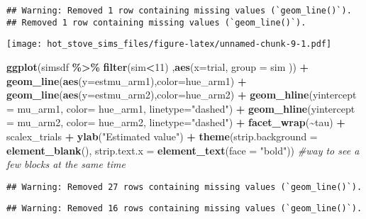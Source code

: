 \documentclass[
]{article}
\newenvironment{Shaded}{\begin{snugshade}}{\end{snugshade}}
\newcommand{\AttributeTok}[1]{\textcolor[rgb]{0.13,0.29,0.53}{#1}}
\newcommand{\CommentTok}[1]{\textcolor[rgb]{0.56,0.35,0.01}{\textit{#1}}}
\newcommand{\DecValTok}[1]{\textcolor[rgb]{0.00,0.00,0.81}{#1}}
\newcommand{\FunctionTok}[1]{\textcolor[rgb]{0.13,0.29,0.53}{\textbf{#1}}}
\newcommand{\NormalTok}[1]{#1}
\newcommand{\SpecialCharTok}[1]{\textcolor[rgb]{0.81,0.36,0.00}{\textbf{#1}}}
\newcommand{\StringTok}[1]{\textcolor[rgb]{0.31,0.60,0.02}{#1}}
\begin{document}
\begin{verbatim}
## Warning: Removed 1 row containing missing values (`geom_line()`).
## Removed 1 row containing missing values (`geom_line()`).
\end{verbatim}

\texttt{[image: hot\_stove\_sims\_files/figure-latex/unnamed-chunk-9-1.pdf]}

\begin{Shaded}
\begin{Highlighting}[]
\FunctionTok{ggplot}\NormalTok{(simsdf }\SpecialCharTok{\%\textgreater{}\%} \FunctionTok{filter}\NormalTok{(sim}\SpecialCharTok{\textless{}}\DecValTok{11}\NormalTok{) ,}\FunctionTok{aes}\NormalTok{(}\AttributeTok{x=}\NormalTok{trial, }\AttributeTok{group =}\NormalTok{ sim )) }\SpecialCharTok{+} 
 \FunctionTok{geom\_line}\NormalTok{(}\FunctionTok{aes}\NormalTok{(}\AttributeTok{y=}\NormalTok{estmu\_arm1),}\AttributeTok{color=}\NormalTok{hue\_arm1) }\SpecialCharTok{+} 
\FunctionTok{geom\_line}\NormalTok{(}\FunctionTok{aes}\NormalTok{(}\AttributeTok{y=}\NormalTok{estmu\_arm2),}\AttributeTok{color=}\NormalTok{hue\_arm2) }\SpecialCharTok{+} 
 \FunctionTok{geom\_hline}\NormalTok{(}\AttributeTok{yintercept =}\NormalTok{ mu\_arm1, }\AttributeTok{color=}\NormalTok{ hue\_arm1, }\AttributeTok{linetype=}\StringTok{"dashed"}\NormalTok{) }\SpecialCharTok{+} 
\FunctionTok{geom\_hline}\NormalTok{(}\AttributeTok{yintercept =}\NormalTok{ mu\_arm2, }\AttributeTok{color=}\NormalTok{ hue\_arm2, }\AttributeTok{linetype=}\StringTok{"dashed"}\NormalTok{) }\SpecialCharTok{+} 
\FunctionTok{facet\_wrap}\NormalTok{(}\SpecialCharTok{\textasciitilde{}}\NormalTok{tau) }\SpecialCharTok{+} 
\NormalTok{scalex\_trials }\SpecialCharTok{+}
\FunctionTok{ylab}\NormalTok{(}\StringTok{"Estimated value"}\NormalTok{) }\SpecialCharTok{+} 
\FunctionTok{theme}\NormalTok{(}\AttributeTok{strip.background =} \FunctionTok{element\_blank}\NormalTok{(), }\AttributeTok{strip.text.x =} \FunctionTok{element\_text}\NormalTok{(}\AttributeTok{face =} \StringTok{"bold"}\NormalTok{)) }\CommentTok{\#way to see a few blocks at the same time}
\end{Highlighting}
\end{Shaded}

\begin{verbatim}
## Warning: Removed 27 rows containing missing values (`geom_line()`).
\end{verbatim}

\begin{verbatim}
## Warning: Removed 16 rows containing missing values (`geom_line()`).
\end{verbatim}
\end{document}
